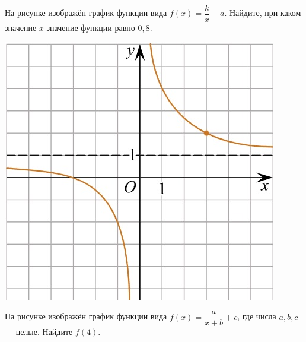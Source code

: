 \begin{class}[number=5]
	\begin{listofex}
		\item
		\begin{minipage}[t]{0.43\textwidth}
			На рисунке изображён график функции вида \(f(x)=\dfrac{k}{x}+a\). Найдите, при каком значение \( x \) значение функции равно \(0,8\).
		\end{minipage}
		\begin{minipage}[c]{0.1\textwidth}
			\includegraphics[align=t, width=\textwidth]{pics/G101M4C5-1.jpg}
		\end{minipage}
		\item
		\begin{minipage}[t]{0.43\textwidth}
			На рисунке изображён график функции вида \(f(x)=\dfrac{a}{x+b}+c\), где числа \(a, b, c\) --- целые. Найдите \(f(4)\).
		\end{minipage}
		\begin{minipage}[c]{0.1\textwidth}

\end{minipage}
\end{listofex}
\end{class}
